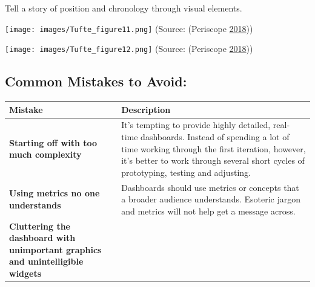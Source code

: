 \documentclass[]{book}
\begin{document}
Tell a story of position and chronology through visual elements.

\texttt{[image: images/Tufte\_figure11.png]}
(Source: (Periscope \protect\hyperlink{ref-narratives_2017}{2018}))

\texttt{[image: images/Tufte\_figure12.png]}
(Source: (Periscope \protect\hyperlink{ref-narratives_2017}{2018}))

\hypertarget{common-mistakes-to-avoid}{%
\subsection{Common Mistakes to Avoid:}\label{common-mistakes-to-avoid}}

\begin{longtable}[]{@{}ll@{}}
\toprule
\begin{minipage}[b]{0.28\columnwidth}\raggedright
\textbf{Mistake}\strut
\end{minipage} & \begin{minipage}[b]{0.66\columnwidth}\raggedright
\textbf{Description}\strut
\end{minipage}\tabularnewline
\midrule
\endhead
\begin{minipage}[t]{0.28\columnwidth}\raggedright
\textbf{Starting off with too much complexity}\strut
\end{minipage} & \begin{minipage}[t]{0.66\columnwidth}\raggedright
It's tempting to provide highly detailed, real-time dashboards. Instead of spending a lot of time working through the first iteration, however, it's better to work through several short cycles of prototyping, testing and adjusting.\strut
\end{minipage}\tabularnewline
\begin{minipage}[t]{0.28\columnwidth}\raggedright
\textbf{Using metrics no one understands}\strut
\end{minipage} & \begin{minipage}[t]{0.66\columnwidth}\raggedright
Dashboards should use metrics or concepts that a broader audience understands. Esoteric jargon and metrics will not help get a message across.\strut
\end{minipage}\tabularnewline
\begin{minipage}[t]{0.28\columnwidth}\raggedright
\textbf{Cluttering the dashboard with unimportant graphics and unintelligible widgets}\strut
\end{minipage} & \begin{minipage}[t]{0.66\columnwidth}\raggedright

\end{minipage}
\end{longtable}
\end{document}
